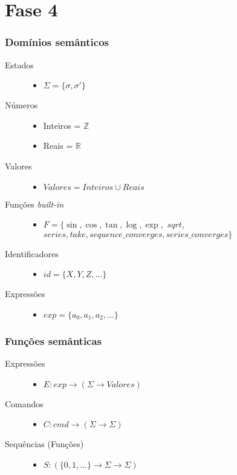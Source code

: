 \documentclass{beamer}
\begin{document}
\section{Fase 4}
\begin{frame}[fragile]
\frametitle{Dom\'inios sem\^anticos}
\begin{description}
\item[Estados]\hfill
  \begin{itemize}
  \item $\Sigma = \{\sigma, \sigma '\}$
  \end{itemize}
\item[N\'umeros]\hfill
  \begin{itemize}
  \item Inteiros = $\mathbb{Z}$
  \item Reais = $\mathbb{R}$
  \end{itemize}
\item[Valores]\hfill
  \begin{itemize}
  \item $Valores = Inteiros \cup Reais$
  \end{itemize}
\item[Fun\c c\~oes \emph{built-in}]\hfill
  \begin{itemize}
  \item $F = \{\sin, \cos, \tan, \log, \exp,$ $sqrt$, \\$series, take, sequence\_converges, series\_converges\}$
  \end{itemize}
\item[Identificadores]\hfill
  \begin{itemize}
  \item $id = \{X, Y, Z, \ldots\}$
  \end{itemize}
\item[Express\~oes]\hfill
  \begin{itemize}
  \item $exp = \{a_0, a_1, a_2, \ldots\}$
  \end{itemize}
\end{description}
\end{frame}

\begin{frame}[fragile]
\frametitle{Fun\c c\~oes sem\^anticas}
\begin{description}
\item[Express\~oes]\hfill
  \begin{itemize}
  \item $E: exp \to (\Sigma \to Valores)$
  \end{itemize}
\item[Comandos]\hfill
  \begin{itemize}
  \item $C: cmd \to (\Sigma \to \Sigma)$
  \end{itemize}
\item[Sequ\^encias (Fun\c c\~oes)]\hfill
  \begin{itemize}
  \item $S : (\{0, 1, \ldots\} \to \Sigma
    \to \Sigma)$
  \end{itemize}
\end{description}
\end{frame}
\end{document}
